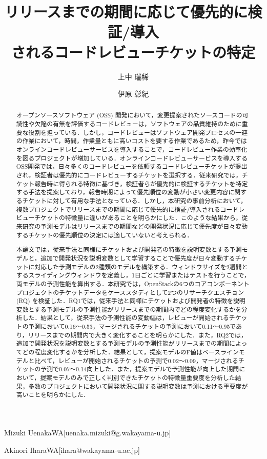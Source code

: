 \documentclass[submit]{ipsj}
\begin{document}
\title{リリースまでの期間に応じて優先的に検証/導入\\されるコードレビューチケットの特定}




\author{上中 瑞稀}{Mizuki Uenaka}{WA}[uenaka.mizuki@g.wakayama-u.jp]
\author{伊原 彰紀}{Akinori Ihara}{WA}[ihara@wakayama-u.ac.jp]

\begin{abstract}
オープンソースソフトウェア (OSS) 開発において，変更提案されたソースコードの可読性や欠陥の有無を評価するコードレビューは，ソフトウェアの品質維持のために重要な役割を担っている．しかし，コードレビューはソフトウェア開発プロセスの一連の作業において，時間，作業量ともに高いコストを要する作業であるため，昨今ではオンラインコードレビューサービスを導入することで，コードレビュー作業の効率化を図るプロジェクトが増加している．オンラインコードレビューサービスを導入するOSS開発では，日々多くのコードレビューを依頼するコードレビューチケットが提出され，検証者は優先的にコードレビューするチケットを選択する．従来研究では，チケット報告時に得られる特徴に基づき，検証者らが優先的に検証するチケットを特定する手法を提案しており，報告時期によって優先順位の変動が小さい変更内容に関するチケットに対して有用な手法となっている．しかし，本研究の事前分析において，複数プロジェクトでリリースまでの期間に応じて優先的に検証/導入されるコードレビューチケットの特徴量に違いがあることを明らかにした．このような結果から，従来研究の予測モデルはリリースまでの期間などの開発状況に応じて優先度が日々変動するチケットの優先順位の決定には適していないと考えられる．

本論文では，従来手法と同様にチケットおよび開発者の特徴を説明変数とする予測モデルと，追加で開発状況を説明変数として学習することで優先度が日々変動するチケットに対応した予測モデルの2種類のモデルを構築する．ウィンドウサイズを2週間とするスライディングウィンドウを定義し，1日ごとに学習またはテストを行うことで，両モデルの予測性能を算出する．本研究では，OpenStackの6つのコアコンポーネントプロジェクトのチケットデータをケーススタディとして2つのリサーチクエスチョン (RQ) を検証した．RQ1では，従来手法と同様にチケットおよび開発者の特徴を説明変数とする予測モデルの予測性能がリリースまでの期間内でどの程度変化するかを分析した．結果として，従来手法の予測性能の変動幅は，レビューが開始されるチケットの予測において0.16〜0.53，マージされるチケットの予測において0.11〜0.95であり，リリースまでの期間内で大きく変化することを明らかにした．また，RQ2では，追加で開発状況を説明変数とする予測モデルの予測性能がリリースまでの期間によってどの程度変化するかを分析した．結果として，提案モデルのF値はベースラインモデルと比べて，レビューが開始されるチケットの予測で0.02〜0.09，マージされるチケットの予測で0.07〜0.14向上した．また，提案モデルで予測性能が向上した期間において，提案モデルのみで正しく判別できたチケットの特徴量重要度を分析した結果，多数のプロジェクトにおいて開発状況に関する説明変数は予測における重要度が高いことを明らかにした．


\end{abstract}
\end{document}
